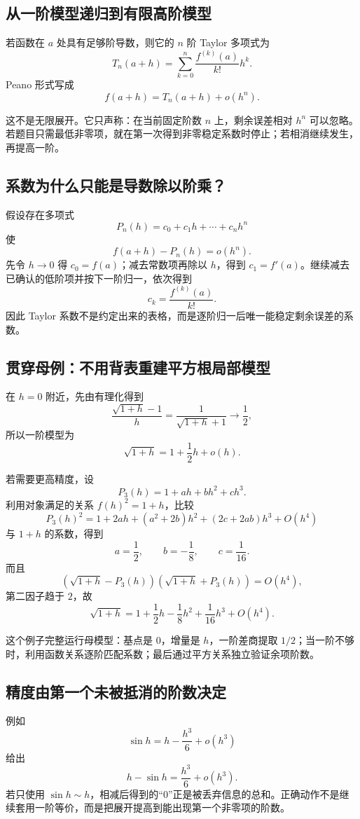 \documentclass[11pt,a4paper]{ctexart}
\begin{document}
\subsection{从一阶模型递归到有限高阶模型}

若函数在 $a$ 处具有足够阶导数，则它的 $n$ 阶 Taylor 多项式为
\[
T_n(a+h)=\sum_{k=0}^{n}\frac{f^{(k)}(a)}{k!}h^k.
\]
Peano 形式写成
\[
\boxed{f(a+h)=T_n(a+h)+o(h^n)}.
\]

这不是无限展开。它只声称：在当前固定阶数 $n$ 上，剩余误差相对 $h^n$ 可以忽略。若题目只需最低非零项，就在第一次得到非零稳定系数时停止；若相消继续发生，再提高一阶。

\subsection{系数为什么只能是导数除以阶乘？}

假设存在多项式
\[
P_n(h)=c_0+c_1h+\cdots+c_n h^n
\]
使
\[
f(a+h)-P_n(h)=o(h^n).
\]
先令 $h\to0$ 得 $c_0=f(a)$；减去常数项再除以 $h$，得到 $c_1=f'(a)$。继续减去已确认的低阶项并按下一阶归一，依次得到
\[
c_k=\frac{f^{(k)}(a)}{k!}.
\]
因此 Taylor 系数不是约定出来的表格，而是逐阶归一后唯一能稳定剩余误差的系数。

\subsection{贯穿母例：不用背表重建平方根局部模型}

在 $h=0$ 附近，先由有理化得到
\[
\frac{\sqrt{1+h}-1}{h}
=\frac1{\sqrt{1+h}+1}\to\frac12,
\]
所以一阶模型为
\[
\sqrt{1+h}=1+\frac12h+o(h).
\]

若需要更高精度，设
\[
P_3(h)=1+ah+bh^2+ch^3.
\]
利用对象满足的关系 ${f(h)}^2=1+h$，比较
\[
{P_3(h)}^2
=1+2ah+(a^2+2b)h^2+(2c+2ab)h^3+O(h^4)
\]
与 $1+h$ 的系数，得到
\[
a=\frac12,
\qquad b=-\frac18,
\qquad c=\frac1{16}.
\]
而且
\[
(\sqrt{1+h}-P_3(h))(\sqrt{1+h}+P_3(h))=O(h^4),
\]
第二因子趋于 $2$，故
\[
\boxed{\sqrt{1+h}=1+\frac12h-\frac18h^2+\frac1{16}h^3+O(h^4)}.
\]

这个例子完整运行母模型：基点是 $0$，增量是 $h$，一阶差商提取 $1/2$；当一阶不够时，利用函数关系逐阶匹配系数；最后通过平方关系独立验证余项阶数。

\subsection{精度由第一个未被抵消的阶数决定}

例如
\[
\sin h=h-\frac{h^3}{6}+o(h^3)
\]
给出
\[
h-\sin h=\frac{h^3}{6}+o(h^3).
\]
若只使用 $\sin h\sim h$，相减后得到的“$0$”正是被丢弃信息的总和。正确动作不是继续套用一阶等价，而是把展开提高到能出现第一个非零项的阶数。
\end{document}
